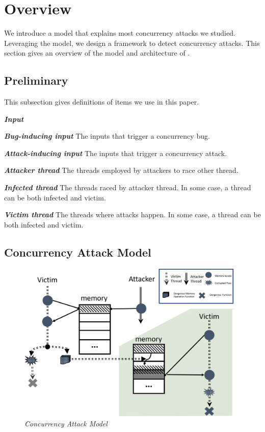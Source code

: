 
\section{Overview}\label{sec:overview}
We introduce a model that explains most concurrency attacks we studied. 
Leveraging the model, we design a framework \xxx
to detect concurrency attacks. 
This section gives an overview of the model and architecture of \xxx.

\subsection{Preliminary}\label{sec:preliminary}

This subsection gives definitions of items we use in this paper.

\emph{\textbf{Input}}

\emph{\textbf{Bug-inducing input}} The inputs that trigger a concurrency bug. 

\emph{\textbf{Attack-inducing input}} The inputs that trigger a concurrency attack.

\emph{\textbf{Attacker thread}} The threads employed by attackers to race other thread.

\emph{\textbf{Infected thread}} The threads raced by attacker thread. In some case, a thread 
can be both infected and victim.

\emph{\textbf{Victim thread}} The threads where attacks happen. In some case, a thread 
can be both infected and victim.


\subsection{Concurrency Attack Model}\label{sec:model}

\begin{figure}
	\centering
	\includegraphics[width=1\columnwidth]{figures/model}
	\vspace{-.25in}
	\caption{{\em Concurrency Attack Model}} 
	\label{fig:model}
	\vspace{-0.1in}
\end{figure}




